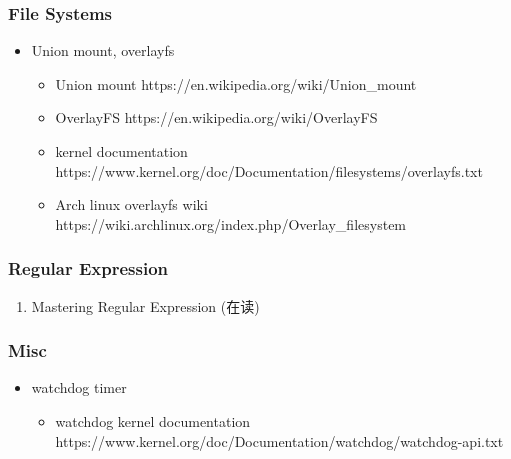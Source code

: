 \documentclass{article}
\begin{document}
\subsubsection{File Systems}
%
\begin{itemize}
    \item Union mount, overlayfs
        \begin{itemize}
            \item Union mount https://en.wikipedia.org/wiki/Union_mount
            \item OverlayFS https://en.wikipedia.org/wiki/OverlayFS
            \item kernel documentation https://www.kernel.org/doc/Documentation/filesystems/overlayfs.txt
            \item Arch linux overlayfs wiki https://wiki.archlinux.org/index.php/Overlay_filesystem
        \end{itemize}
\end{itemize}
\subsubsection{Regular Expression}
\begin{enumerate}
    \item Mastering Regular Expression (在读)
\end{enumerate}
%
\subsubsection{Misc}
%
\begin{itemize}
    \item watchdog timer
        \begin{itemize}
            \item watchdog kernel documentation https://www.kernel.org/doc/Documentation/watchdog/watchdog-api.txt
        \end{itemize}
\end{itemize}
%
\end{document}

